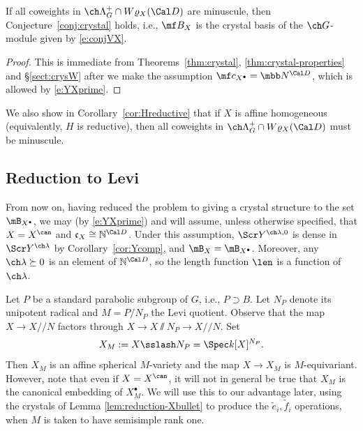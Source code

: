 \begin{cor}
\notready \label{cor:minuscule}
If all coweights in $\ch\Lambda^+_G \cap W\varrho_X(\Cal D)$ are
minuscule, then Conjecture~\ref{conj:crystal} holds, i.e., $\mf B_{X}$ is the crystal basis of
the $\ch G$-module given by \eqref{e:conjVX}.
\end{cor}
\begin{proof}
This is immediate from Theorems~\ref{thm:crystal}, \ref{thm:crystal-properties} and
\S\ref{sect:crysW} after we make the assumption $\mf c_{X^\bullet} = \mbb N^{\Cal D}$, which is
allowed by \eqref{e:YXprime}.
\end{proof}

We also show in Corollary~\ref{cor:Hreductive} that if $X$ is affine homogeneous (equivalently, $H$ is reductive), then
all coweights in $\ch\Lambda^+_G\cap W\varrho_X(\Cal D)$ must be minuscule.

\subsection{Reduction to Levi}
\label{sect:crystal-reduction}

From now on, having reduced the problem to giving a crystal structure to the set $\mB_{X^\bullet}$, we may (by \eqref{e:YXprime}) and will assume, unless
otherwise specified, that $X = X^\can$ and $\mathfrak c_X \cong
\mathbb N^{\Cal D}$.
Under this assumption, $\Scr Y^{\ch\lambda,0}$ is dense in $\Scr Y^{\ch\lambda}$ by
Corollary~\ref{cor:Ycomp}, and $\mB_X = \mB_{X^\bullet}$. Moreover, any $\ch\lambda\succeq 0$ is an element of $\mathbb N^{\Cal D}$, so the length function $\len$ is a function of $\ch\lambda$.




Let $P$ be a standard parabolic subgroup of $G$, i.e., $P \supset B$.
Let $N_P$ denote its unipotent radical and $M=P/N_P$ the Levi quotient.
Observe that the map $X \to X/\!\!/N$ factors through
$X \to X \sslash N_P \to X/\!\!/N$.
Set
\[ X_M := X \sslash N_P = \Spec k[X]^{N_P}. \]
Then $X_M$ is an affine spherical $M$-variety
and the map $X \to X_M$ is $M$-equivariant.
However, note that even if $X = X^\can$, it will not in general
be true that $X_M$ is the canonical embedding of $X_M^\bullet$. We will use this
to our advantage later, using the crystals of Lemma \ref{lem:reduction-Xbullet} to produce the $\tilde e_i,\tilde f_i$ operations, when $M$ is taken to have semisimple rank one.

